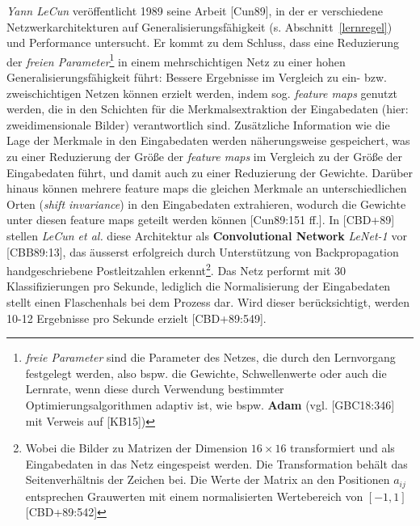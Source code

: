 \textit{Yann LeCun} veröffentlicht 1989 seine Arbeit [Cun89], in der er verschiedene Netzwerkarchitekturen auf Generalisierungsfähigkeit (s. Abschnitt~\ref{lernregel}) und Performance untersucht. Er kommt zu dem Schluss, dass eine Reduzierung der \textit{freien Parameter}\footnote{
    \textit{freie Parameter} sind die Parameter des Netzes, die durch den Lernvorgang festgelegt werden, also bspw. die Gewichte, Schwellenwerte oder auch die Lernrate, wenn diese durch Verwendung bestimmter Optimierungsalgorithmen adaptiv ist, wie bspw. \textbf{Adam} (vgl. [GBC18:346] mit Verweis auf [KB15])
} in einem mehrschichtigen Netz zu einer hohen Generalisierungsfähigkeit führt: Bessere Ergebnisse im Vergleich zu  ein- bzw. zweischichtigen Netzen können erzielt werden, indem sog. \textit{feature maps} genutzt werden, die in den Schichten für die Merkmalsextraktion der Eingabedaten (hier: zweidimensionale Bilder) verantwortlich sind.
Zusätzliche Information wie die Lage der Merkmale in den Eingabedaten werden näherungsweise gespeichert, was zu einer Reduzierung der Größe der \textit{feature maps} im Vergleich zu der Größe der Eingabedaten führt, und damit auch zu einer Reduzierung der Gewichte.
Darüber hinaus können mehrere feature maps die gleichen Merkmale an unterschiedlichen Orten (\textit{shift invariance}) in den Eingabedaten extrahieren, wodurch die Gewichte unter diesen feature maps geteilt werden können [Cun89:151 ff.].
In [CBD+89] stellen \textit{LeCun et al.} diese Architektur als \textbf{Convolutional Network} \textit{LeNet-1}  vor [CBB89:13], das äusserst erfolgreich durch Unterstützung von Backpropagation  handgeschriebene Postleitzahlen erkennt\footnote{
    Wobei die Bilder zu Matrizen der Dimension $16 \times 16$ transformiert und als Eingabedaten in das Netz eingespeist werden. Die Transformation behält das Seitenverhältnis der Zeichen bei. Die Werte der Matrix an den Positionen $a_{ij}$ entsprechen Grauwerten mit einem normalisierten Wertebereich von $[-1, 1]$ [CBD+89:542]
}. Das Netz performt mit 30 Klassifizierungen pro Sekunde, lediglich die Normalisierung der Eingabedaten stellt einen Flaschenhals bei dem Prozess dar. Wird dieser berücksichtigt, werden 10-12 Ergebnisse pro Sekunde erzielt [CBD+89:549].\\



